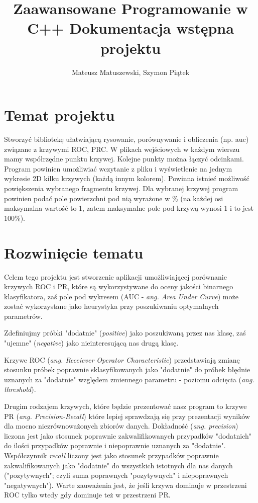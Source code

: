 \documentclass[12pt,a4paper,titlepage]{article}
\title{Zaawansowane Programowanie w C++ Dokumentacja wstępna projektu}
\author{Mateusz Matuszewski, Szymon Piątek}
\begin{document}
\maketitle
\section{Temat projektu}
Stworzyć bibliotekę ułatwiającą rysowanie, porównywanie i obliczenia (np. auc) związane z krzywymi ROC, PRC. W plikach wejściowych w każdym wierszu mamy współrzędne punktu krzywej. Kolejne punkty można łączyć odcinkami. Program powinien umożliwiać wczytanie z pliku i wyświetlenie na jednym wykresie 2D kilku krzywych (każdą innym kolorem). Powinna istnieć możliwość powiększenia wybranego fragmentu krzywej. Dla wybranej krzywej program powinien podać pole powierzchni pod nią wyrażone w \% (na każdej osi maksymalna wartość to 1, zatem maksymalne pole pod krzywą wynosi 1 i to jest 100\%).
\section{Rozwinięcie tematu}
Celem tego projektu jest stworzenie aplikacji umożliwiającej porównanie krzywych ROC i PR, które są wykorzystywane do oceny jakości binarnego klasyfikatora, zaś pole pod wykresem (AUC - \textit{ang. Area Under Curve}) może zostać wykorzystane jako heurystyka przy poszukiwaniu optymalnych parametrów.

Zdefiniujmy próbki "dodatnie" (\textit{positive}) jako poszukiwaną przez nas klasę, zaś "ujemne" (\textit{negative}) jako nieinteresującą nas drugą klasę.

Krzywe ROC (\textit{ang. Receiever Operator Characteristic}) przedstawiają zmianę stosunku próbek poprawnie sklasyfikowanych jako "dodatnie" do próbek błędnie uznanych za "dodatnie" względem zmiennego parametru - poziomu odcięcia (\textit{ang. threshold}).

Drugim rodzajem krzywych, które będzie prezentować nasz program to krzywe PR (\textit{ang. Precision-Recall}) które lepiej sprawdzają się przy prezentacji wyników dla mocno niezrównoważonych zbiorów danych. Dokładność (\textit{ang. precision}) liczona jest jako stosunek poprawnie zakwalifikowanych przypadków "dodatnich" do ilości przypadków poprawnie i niepoprawnie uznanych za "dodatnie". Współczynnik \textit{recall} liczony jest jako stosunek przypadków poprawnie zakwalifikowanych jako "dodatnie" do wszystkich istotnych dla nas danych ("pozytywnych"; czyli suma poprawnych "pozytywnych" i niepoprawnych "negatywnych"). Warte zauważenia jest, że jeśli krzywa dominuje w przestrzeni ROC tylko wtedy gdy dominuje też w przestrzeni PR.
\end{document}

